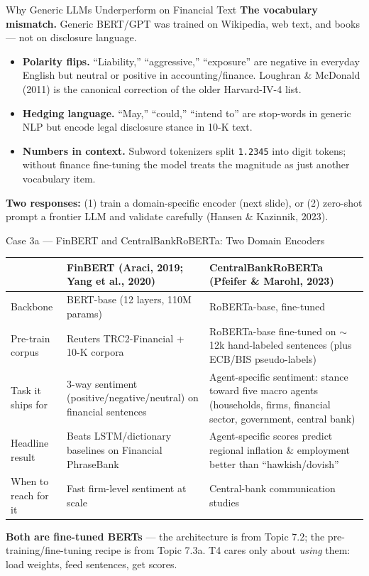 \begin{frame}{Why Generic LLMs Underperform on Financial Text}
\textbf{The vocabulary mismatch.} Generic BERT/GPT was trained on Wikipedia, web text, and books --- not on disclosure language.

\medskip
\begin{itemize}
  \item \textbf{Polarity flips.} ``Liability,'' ``aggressive,'' ``exposure'' are negative in everyday English but neutral or positive in accounting/finance. Loughran \& McDonald (2011) is the canonical correction of the older Harvard-IV-4 list.
  \medskip
  \item \textbf{Hedging language.} ``May,'' ``could,'' ``intend to'' are stop-words in generic NLP but encode legal disclosure stance in 10-K text.
  \medskip
  \item \textbf{Numbers in context.} Subword tokenizers split \texttt{1.2345} into digit tokens; without finance fine-tuning the model treats the magnitude as just another vocabulary item.
\end{itemize}

\medskip
\textbf{Two responses:} (1) train a domain-specific encoder (next slide), or (2) zero-shot prompt a frontier LLM and validate carefully (Hansen \& Kazinnik, 2023).
\end{frame}

\begin{frame}{Case 3a --- FinBERT and CentralBankRoBERTa: Two Domain Encoders}
\begin{center}
\renewcommand{\arraystretch}{1.25}
\footnotesize
\begin{tabular}{|p{2.6cm}|p{4.0cm}|p{6.4cm}|}
\hline
& \textbf{FinBERT} (Araci, 2019; Yang et al., 2020) & \textbf{CentralBankRoBERTa} (Pfeifer \& Marohl, 2023) \\ \hline
Backbone & BERT-base (12 layers, 110M params) & RoBERTa-base, fine-tuned \\ \hline
Pre-train corpus & Reuters TRC2-Financial + 10-K corpora & RoBERTa-base fine-tuned on $\sim$12k hand-labeled sentences (plus ECB/BIS pseudo-labels) \\ \hline
Task it ships for & 3-way sentiment (positive/negative/neutral) on financial sentences & Agent-specific sentiment: stance toward five macro agents (households, firms, financial sector, government, central bank) \\ \hline
Headline result & Beats LSTM/dictionary baselines on Financial PhraseBank & Agent-specific scores predict regional inflation \& employment better than ``hawkish/dovish'' \\ \hline
When to reach for it & Fast firm-level sentiment at scale & Central-bank communication studies \\ \hline
\end{tabular}
\end{center}

\medskip
\textbf{Both are fine-tuned BERTs} --- the architecture is from Topic 7.2; the pre-training/fine-tuning recipe is from Topic 7.3a. T4 cares only about \emph{using} them: load weights, feed sentences, get scores.
\end{frame}

